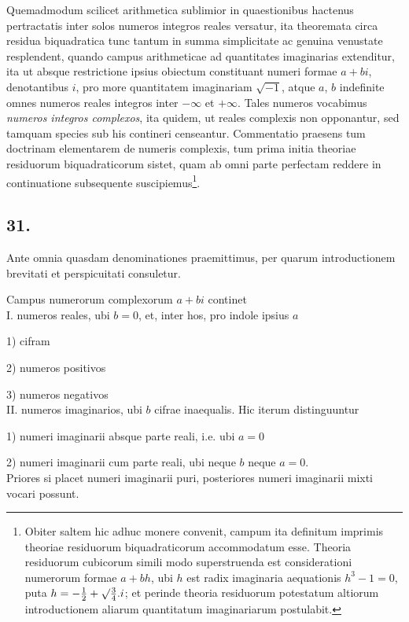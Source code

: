 \documentclass[twoside,12pt]{memoir}
\let\oldfrac\frac
\def\frac#1#2{\mathchoice{\tfrac{#1}{#2}}{\oldfrac{#1}{#2}}{\genfrac{}{}{}{2}{#1}{#2\mathstrut}}{\genfrac{}{}{}{3}{#1}{#2\mathstrut}}}
\begin{document}
Quemadmodum scilicet arithmetica sublimior in quaestionibus hactenus pertractatis inter solos numeros integros reales versatur, ita theoremata circa residua biquadratica tunc tantum in summa simplicitate ac genuina venustate resplendent, quando campus arithmeticae ad quantitates imaginarias extenditur, ita ut absque restrictione ipsius obiectum constituant numeri formae \(a+b i\), denotantibus \(i\), pro more quantitatem imaginariam \(\surd{-1}\), atque \(a\), \(b\) indefinite omnes numeros reales integros inter \(-\infty\) et \(+\infty\). Tales numeros vocabimus \textit{numeros integros complexos}, ita quidem, ut reales complexis non opponantur, sed tamquam species sub his contineri censeantur. Commentatio praesens tum doctrinam elementarem de numeris complexis, tum prima initia theoriae residuorum biquadraticorum sistet, quam ab omni parte perfectam reddere in continuatione subsequente suscipiemus\footnote{Obiter saltem hic adhuc monere convenit, campum ita definitum imprimis theoriae residuorum biquadraticorum accommodatum esse. Theoria residuorum cubicorum simili modo superstruenda est considerationi numerorum formae \(a+b h\), ubi \(h\) est radix imaginaria aequationis \(h^{3}-1=0\), puta \(h=-\frac{1}{2}+\surd{\frac{3}{4}}.i\); et perinde theoria residuorum potestatum altiorum introductionem aliarum quantitatum imaginariarum postulabit.}.

\subsection*{31.}
 
Ante omnia quasdam denominationes praemittimus, per quarum introductionem brevitati et perspicuitati consuletur.
 
Campus numerorum complexorum \(a+b i\) continet\\
I. numeros reales, ubi \(b=0\), et, inter hos, pro indole ipsius \(a\)
 
1) cifram
 
2) numeros positivos
 
3) numeros negativos\\
II. numeros imaginarios, ubi \(b\) cifrae inaequalis. Hic iterum distinguuntur
 
1) numeri imaginarii absque parte reali, i.e. ubi \(a=0\)
 
2) numeri imaginarii cum parte reali, ubi neque \(b\) neque \(a=0\).\\
Priores si placet numeri imaginarii puri, posteriores numeri imaginarii mixti vocari possunt.\pagebreak%
\end{document}
